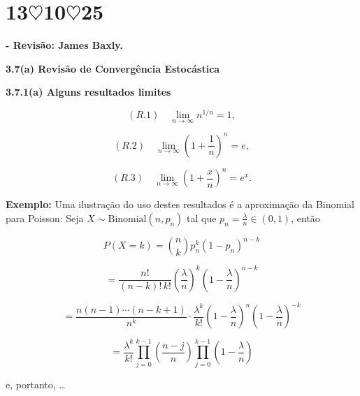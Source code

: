 \section*{13$\heartsuit$10$\heartsuit$25}

\noindent \textbf{- Revisão: James Baxly.}

\noindent \textbf{3.7(a) Revisão de Convergência Estocástica}

\noindent \textbf{3.7.1(a) Alguns resultados limites}

\begin{equation}
(R.1) \quad \lim_{n \to \infty} n^{1/n} = 1,
\end{equation}

\begin{equation}
(R.2) \quad \lim_{n \to \infty} \left( 1 + \frac{1}{n} \right)^n = e,
\end{equation}

\begin{equation}
(R.3) \quad \lim_{n \to \infty} \left( 1 + \frac{x}{n} \right)^n = e^x.
\end{equation}

\noindent \textbf{Exemplo:} Uma ilustração do uso destes resultados é a aproximação da Binomial para Poisson: Seja $X \sim \text{Binomial}(n, p_n)$ tal que $p_n = \frac{\lambda}{n} \in (0,1)$, então

\begin{equation}
P(X = k) = \binom{n}{k} p_n^k (1 - p_n)^{n-k}
\end{equation}

\begin{equation}
= \frac{n!}{(n-k)! \, k!} \left( \frac{\lambda}{n} \right)^k \left( 1 - \frac{\lambda}{n} \right)^{n-k}
\end{equation}

\begin{equation}
= \frac{n (n-1) \cdots (n-k+1)}{n^k} \cdot \frac{\lambda^k}{k!} \left( 1 - \frac{\lambda}{n} \right)^n \left( 1 - \frac{\lambda}{n} \right)^{-k}
\end{equation}

\begin{equation}
= \frac{\lambda^k}{k!} \prod_{j=0}^{k-1} \left( \frac{n-j}{n} \right) \prod_{j=0}^{k-1} \left( 1 - \frac{\lambda}{n} \right)
\end{equation}

\noindent e, portanto, \dots